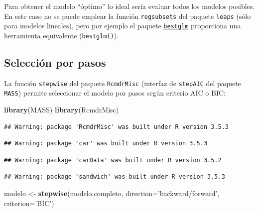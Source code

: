 \documentclass[]{book}
\newenvironment{Shaded}{\begin{snugshade}}{\end{snugshade}}
\newcommand{\KeywordTok}[1]{\textcolor[rgb]{0.13,0.29,0.53}{\textbf{#1}}}
\newcommand{\DataTypeTok}[1]{\textcolor[rgb]{0.13,0.29,0.53}{#1}}
\newcommand{\StringTok}[1]{\textcolor[rgb]{0.31,0.60,0.02}{#1}}
\newcommand{\NormalTok}[1]{#1}
\begin{document}
Para obtener el modelo ``óptimo'' lo ideal sería evaluar todos los
modelos posibles. En este caso no se puede emplear la función
\texttt{regsubsets} del paquete \texttt{leaps} (sólo para modelos
lineales), pero por ejemplo el paquete
\href{https://cran.r-project.org/web/packages/bestglm/vignettes/bestglm.pdf}{\texttt{bestglm}}
proporciona una herramienta equivalente (\texttt{bestglm()}).

\subsection{Selección por pasos}\label{seleccion-por-pasos-1}

La función \texttt{stepwise} del paquete \texttt{RcmdrMisc} (interfaz de
\texttt{stepAIC} del paquete \texttt{MASS}) permite seleccionar el
modelo por pasos según criterio AIC o BIC:

\begin{Shaded}
\begin{Highlighting}[]
\KeywordTok{library}\NormalTok{(MASS)}
\KeywordTok{library}\NormalTok{(RcmdrMisc)}
\end{Highlighting}
\end{Shaded}

\begin{verbatim}
## Warning: package 'RcmdrMisc' was built under R version 3.5.3
\end{verbatim}

\begin{verbatim}
## Warning: package 'car' was built under R version 3.5.3
\end{verbatim}

\begin{verbatim}
## Warning: package 'carData' was built under R version 3.5.2
\end{verbatim}

\begin{verbatim}
## Warning: package 'sandwich' was built under R version 3.5.3
\end{verbatim}

\begin{Shaded}
\begin{Highlighting}[]
\NormalTok{modelo <-}\StringTok{ }\KeywordTok{stepwise}\NormalTok{(modelo.completo, }\DataTypeTok{direction=}\StringTok{'backward/forward'}\NormalTok{, }\DataTypeTok{criterion=}\StringTok{'BIC'}\NormalTok{)}
\end{Highlighting}
\end{Shaded}
\end{document}
